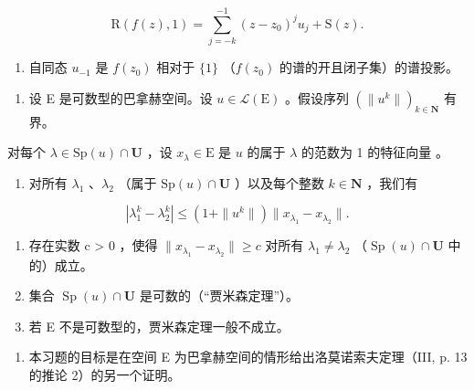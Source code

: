 \[
\mathrm{R} (f (z), 1) = \sum_ {j = - k} ^ {- 1} (z - z _ {0}) ^ {j} u _ {j} + \mathrm{S} (z).
\]

\begin{enumerate}
\def\labelenumi{\alph{enumi})}
\setcounter{enumi}{4}
\tightlist
\item
  自同态 \(u_{-1}\) 是 \(f(z_0)\) 相对于 \(\{1\}\) （\(f(z_0)\) 的谱的开且闭子集）的谱投影。
\end{enumerate}

\begin{enumerate}
\def\labelenumi{\arabic{enumi})}
\setcounter{enumi}{3}
\tightlist
\item
  设 E 是可数型的巴拿赫空间。设 \(u \in \mathcal{L}(\mathrm{E})\) 。假设序列 \((\| u^k \|)_{k \in \mathbf{N}}\) 有界。
\end{enumerate}

对每个 \(\lambda\in\mathrm{Sp}(u)\cap\mathbf{U}\) ，设 \(x_{\lambda}\in\mathrm{E}\) 是 \(u\) 的属于 \(\lambda\) 的范数为 1 的特征向量 。

\begin{enumerate}
\def\labelenumi{\alph{enumi})}
\tightlist
\item
  对所有 \(\lambda_1\) 、\(\lambda_2\) （属于 \(\mathrm{Sp}(u) \cap \mathbf{U}\) ）以及每个整数 \(k \in \mathbf{N}\) ，我们有
\end{enumerate}

\[
\left| \lambda_ {1} ^ {k} - \lambda_ {2} ^ {k} \right| \leqslant \left(1 + \| u ^ {k} \|\right) \| x _ {\lambda_ {1}} - x _ {\lambda_ {2}} \|.
\]

\begin{enumerate}
\def\labelenumi{\alph{enumi})}
\setcounter{enumi}{1}
\item
  存在实数 c \textgreater{} 0 ，使得 \(\|x_{\lambda_{1}} - x_{\lambda_{2}}\| \geqslant c\) 对所有 \(\lambda_{1} \neq \lambda_{2}\) （\(\operatorname{Sp}(u) \cap \mathbf{U}\) 中的）成立。
\item
  集合 \(\operatorname{Sp}(u) \cap \mathbf{U}\) 是可数的（“贾米森定理”）。
\item
  若 E 不是可数型的，贾米森定理一般不成立。
\end{enumerate}

\begin{enumerate}
\def\labelenumi{\arabic{enumi})}
\setcounter{enumi}{4}
\tightlist
\item
  本习题的目标是在空间 E 为巴拿赫空间的情形给出洛莫诺索夫定理（III, p. 13 的推论 2）的另一个证明。
\end{enumerate}

